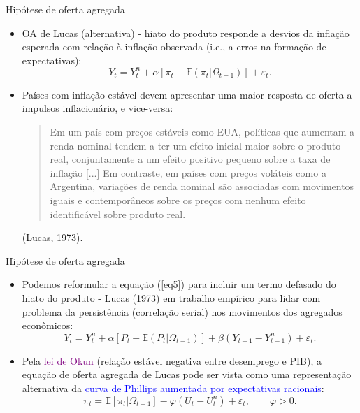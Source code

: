 \documentclass[10pt]{beamer}
\begin{document}
\begin{frame}{Hipótese de oferta agregada}
    \begin{itemize}
        \item OA de Lucas (alternativa) - hiato do produto responde a desvios da inflação esperada com relação à inflação observada (i.e., a erros na formação de expectativas):
        \begin{equation}
            Y_t = Y_t^n + \alpha[\pi_t - \mathbb{E}(\pi_t|\Omega_{t-1})] + \varepsilon_t.
            \label{eq5}
        \end{equation}
        \bigskip
        \item Países com inflação estável  devem apresentar uma maior resposta de oferta a impulsos inflacionário, e vice-versa:
        \begin{quote}
            Em um país com preços estáveis como EUA, políticas que aumentam a renda nominal tendem a ter um efeito inicial maior sobre o produto real, conjuntamente a um efeito positivo pequeno sobre a taxa de inflação [...] Em contraste, em países com preços voláteis como a Argentina, variações de renda nominal são associadas com movimentos iguais e contemporâneos sobre os preços com nenhum efeito identificável sobre produto real.
        \end{quote}
        \begin{flushright}
            (Lucas, 1973).
        \end{flushright}
    \end{itemize}
\end{frame}

\begin{frame}{Hipótese de oferta agregada}
    \begin{itemize}
        \item Podemos reformular a equação (\ref{eq5}) para incluir um termo defasado do hiato do produto - Lucas (1973) em trabalho empírico para lidar com problema da persistência (correlação serial) nos movimentos dos agregados econômicos:
        \begin{equation}
            Y_t = Y_t^n + \alpha[P_t - \mathbb{E}(P_t|\Omega_{t-1})] + \beta(Y_{t-1}-Y_{t-1}^n) + \varepsilon_t.
            \label{eq6}
        \end{equation}
        \bigskip
        \item Pela \textcolor{purple}{lei de Okun} (relação estável negativa entre desemprego e PIB), a equação de oferta agregada de Lucas pode ser vista como uma representação alternativa da \textcolor{blue}{curva de Phillips aumentada por expectativas racionais}:
        \begin{equation}
            \pi_t = \mathbb{E}[\pi_t|\Omega_{t-1}] - \varphi(U_t - U_t^n) + \varepsilon_t, \qquad \varphi > 0.
            \label{eq7}
        \end{equation}
    \end{itemize}
\end{frame}
\end{document}
